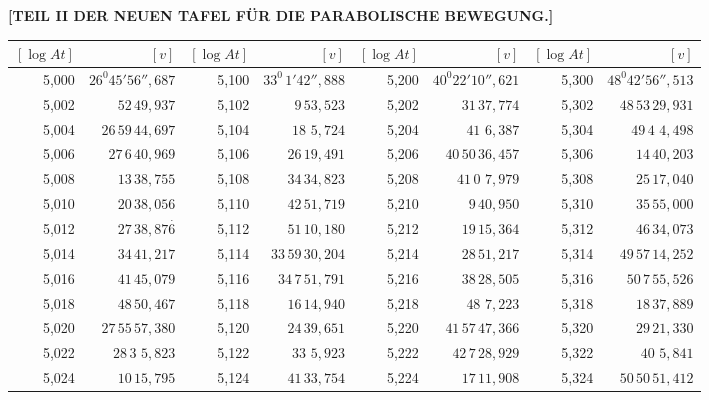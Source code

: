 \clearpage
{}
\begingroup
\centering
\fontsize{9}{9}\selectfont
\setlength{\tabcolsep}{1.25pt}
\renewcommand{\arraystretch}{.9}
\setlength{\parskip}{0pt}
\textbf{[TEIL II DER NEUEN TAFEL FÜR DIE PARABOLISCHE BEWEGUNG.]}
\par\vspace{7pt}
\begin{tabular}{|r|r||r|r||r|r||r|r|}
\hline
\([\log At]\) & \([v]\) & \([\log At]\) & \([v]\) & \([\log At]\) & \([v]\) & \([\log At]\) & \([v]\) \\
\hline
5,000 & \(26^{0}45'56'',\!687\) & 5,100 & \(33^{0}\,1'42'',\!888\) & 5,200 & \(40^{0}22'10'',\!621\) & 5,300 & \(48^{0}42'56'',\!513\) \\[1pt]
5,002 & \(52\,49,\!937\) & 5,102 & \(9\,53,\!523\) & 5,202 & \(31\,37,\!774\) & 5,302 & \(48\,53\,29,\!931\) \\
5,004 & \(26\,59\,44,\!697\) & 5,104 & \(18\,\,5,\!724\) & 5,204 & \(41\,\,6,\!387\) & 5,304 & \(49\,4\,\,4,\!498\) \\
5,006 & \(27\,6\,40,\!969\) & 5,106 & \(26\,19,\!491\) & 5,206 & \(40\,50\,36,\!457\) & 5,306 & \(14\,40,\!203\) \\
5,008 & \(13\,38,\!755\) & 5,108 & \(34\,34,\!823\) & 5,208 & \(41\,0\,\,7,\!979\) & 5,308 & \(25\,17,\!040\) \\[1pt]
5,010 & \(20\,38,\!056\) & 5,110 & \(42\,51,\!719\) & 5,210 & \(9\,40,\!950\) & 5,310 & \(35\,55,\!000\) \\[1pt]
5,012 & \(27\,38,\!87\overset{\cdot}{6}\) & 5,112 & \(51\,10,\!180\) & 5,212 & \(19\,15,\!364\) & 5,312 & \(46\,34,\!073\) \\
5,014 & \(34\,41,\!217\) & 5,114 & \(33\,59\,30,\!204\) & 5,214 & \(28\,51,\!217\) & 5,314 & \(49\,57\,14,\!252\) \\
5,016 & \(41\,45,\!079\) & 5,116 & \(34\,7\,51,\!791\) & 5,216 & \(38\,28,\!505\) & 5,316 & \(50\,7\,55,\!526\) \\
5,018 & \(48\,50,\!467\) & 5,118 & \(16\,14,\!940\) & 5,218 & \(48\,\,7,\!223\) & 5,318 & \(18\,37,\!889\) \\[1pt]
5,020 & \(27\,55\,57,\!380\) & 5,120 & \(24\,39,\!651\) & 5,220 & \(41\,57\,47,\!366\) & 5,320 & \(29\,21,\!330\) \\[1pt]
5,022 & \(28\,3\,\,5,\!823\) & 5,122 & \(33\,\,5,\!923\) & 5,222 & \(42\,7\,28,\!929\) & 5,322 & \(40\,\,5,\!841\) \\
5,024 & \(10\,15,\!795\) & 5,124 & \(41\,33,\!754\) & 5,224 & \(17\,11,\!908\) & 5,324 & \(50\,50\,51,\!412\) \\

\end{tabular}
